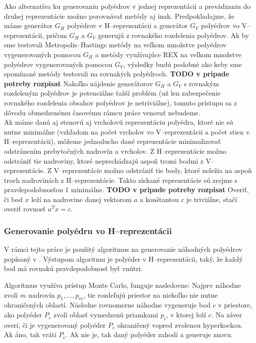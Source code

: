 Ako alternatíva ku generovaniu polyédrov v jednej reprezentácii a prevádzaniu do druhej reprezentácie možno porovnávať metódy aj inak. 
Predpokladajme, že máme generátor $G_H$ polyédrov v H--reprezentácii a generátor $G_V$ polyédrov vo V--reprezentácii, pričom $G_H$ a $G_V$ generujú z rovnakého rozdelenia polyédrov.
Ak by sme testovali Metropolis--Hastings metódy na veľkom množstve polyédrov vygenerovaných pomocou $G_H$ a metódy využívajúce REX na veľkom množstve polyédrov vygenerovaných pomocou $G_V$, výsledky budú podobné ako keby sme spomínané metódy testovali na rovnakých polyédroch. \textbf{TODO v pripade potreby rozpisat}
Nakoľko nájdenie generátorov $G_H$ a $G_V$ s rovnakým rozdeleným polyédrov je potenciálne ťažší problém (už len zabezpečenie rovnakého rozdelenia obsahov polyédrov je netriviálne), tomuto prístupu sa z dôvodu obmedzenému časovému rámcu práce venovať nebudeme.\\

Ak máme danú aj stenovú aj vrcholovú reprezentáciu polyédra, ktoré nie sú nutne minimálne (vzhľadom na počet vrcholov vo V--reprezentácii a počet stien v H--reprezentácii), môžeme jednoducho dané reprezentácie minimalizovať odstránením prebytočných nadrovín a vrcholov. Z H--reprezentácie možno odstrániť tie nadroviny, ktoré neprechádzajú aspoň tromi bodmi z V--reprezentácie. Z V--reprezentácie možno odstrániť tie body, ktoré neležia na aspoň troch nadrovinách z H--reprezentácie. Takto získané reprezentácie sú zrejme s pravdepodobnosťou $1$ minimálne. \textbf{TODO v pripade potreby rozpisat}
Overiť, či bod $x$ leží na nadrovine danej vektorom $a$ a konštantou $c$ je triviálne, stačí overiť rovnosť $a^Tx=c$.

\subsubsection{Generovanie polyédru vo H--reprezentácii}

V rámci tejto práce je použitý algoritmus na generovanie náhodných polyédrov popísaný v \cite{may_random}. Výstupom algoritmu je polyéder v H--reprezentácii, taký, že každý bod má rovnakú pravdepodobnosť byť vnútri. 

Algoritmus využíva prístup Monte Carlo, funguje nasledovne: Najprv náhodne zvolí $m$ nadrovín $p_1, \dots, p_m$, tie rozdeľujú priestor na niekoľko nie nutne ohraničených oblastí.
Následne rovnomerne náhodne vygeneruje bod $c$ v priestore, ako polyéder $P_c$ zvolí oblasť vymedzenú priamkami $p_i$, v ktorej leží $c$.
Na záver overí, či je vygenerovaný polyéder $P_c$ ohraničený vopred zvolenou hyperkockou. Ak áno, tak vráti $P_c$. Ak nie je, tak daný polyéder zahodí a generuje znovu.

